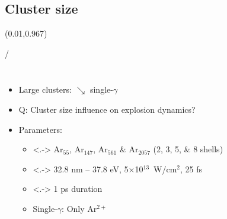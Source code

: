 \documentclass{beamer}
\makeatletter
\newcommand{\framenumber}{
\begin{textblock}{0}(0.01,0.967)
\begin{scriptsize}
{\color{gray}\insertframenumber/\inserttotalframenumber}
\end{scriptsize}
\end{textblock}
}
\makeatother
\begin{document}
\subsection{Cluster size}
\begin{frame}{}\framenumber{}
    \begin{columns}
        \begin{itemize}
            \item<+-> Large clusters: $\searrow$ single-$\gamma$
            \item<+-> Q: Cluster size influence on explosion dynamics?
            \item<+-> Parameters:
            \begin{itemize}
                \item<.-> Ar$_{55}$, Ar$_{147}$, Ar$_{561}$ \& Ar$_{2057}$ (2, 3, 5, \& 8 shells)
                \item<.-> 32.8 nm -- 37.8 eV, 5$\times$10$^{13}$~W/cm$^2$, 25 fs
                \item<.-> 1 ps duration
                \item<+-> Single-$\gamma$: Only Ar$^{2+}$
            \end{itemize}
        \end{itemize}
        \color{white}\color{black}


\end{columns}
\end{frame}
\end{document}

